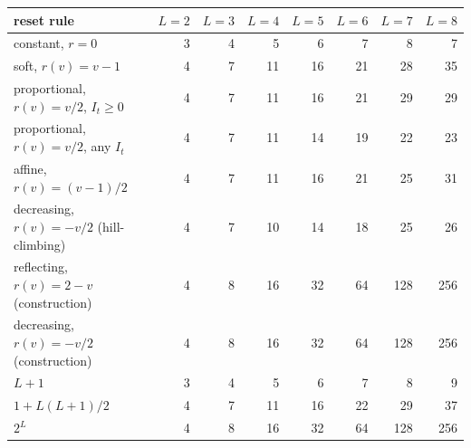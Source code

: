 \begin{tabular}{lrrrrrrr}
\toprule
reset rule & $L=2$ & $L=3$ & $L=4$ & $L=5$ & $L=6$ & $L=7$ & $L=8$\\
\midrule
constant, $r=0$ & 3 & 4 & 5 & 6 & 7 & 8 & 7\\
soft, $r(v)=v-1$ & 4 & 7 & 11 & 16 & 21 & 28 & 35\\
proportional, $r(v)=v/2$, $I_t\ge0$ & 4 & 7 & 11 & 16 & 21 & 29 & 29\\
proportional, $r(v)=v/2$, any $I_t$ & 4 & 7 & 11 & 14 & 19 & 22 & 23\\
affine, $r(v)=(v-1)/2$ & 4 & 7 & 11 & 16 & 21 & 25 & 31\\
decreasing, $r(v)=-v/2$ (hill-climbing) & 4 & 7 & 10 & 14 & 18 & 25 & 26\\
reflecting, $r(v)=2-v$ (construction) & 4 & 8 & 16 & 32 & 64 & 128 & 256\\
decreasing, $r(v)=-v/2$ (construction) & 4 & 8 & 16 & 32 & 64 & 128 & 256\\
\midrule
$L+1$ & 3 & 4 & 5 & 6 & 7 & 8 & 9\\
$1+L(L+1)/2$ & 4 & 7 & 11 & 16 & 22 & 29 & 37\\
$2^L$ & 4 & 8 & 16 & 32 & 64 & 128 & 256\\
\bottomrule
\end{tabular}
